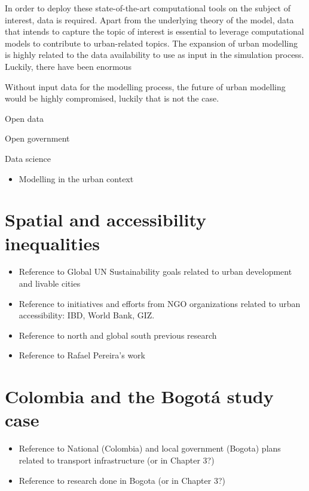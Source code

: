 \documentclass[12pt, a4paper]{report}
\begin{document}
In order to deploy these state-of-the-art computational tools on the subject of interest, data is required. Apart from the underlying theory of the model, data that intends to capture the topic of interest is essential to leverage computational models to contribute to urban-related topics. The expansion of urban modelling is highly related to the data availability to use as input in the simulation process. Luckily, there have been enormous 

Without input data for the modelling process, the future of urban modelling would be highly compromised, luckily that is not the case. 

Open data

Open government

Data science

\begin{itemize}
  \item Modelling in the urban context
\end{itemize}

\section{Spatial and accessibility inequalities}

\begin{itemize}
  \item Reference to Global UN Sustainability goals related to urban development and livable cities
  \item Reference to initiatives and efforts from NGO organizations related to urban accessibility: IBD, World Bank, GIZ.
  \item Reference to north and global south previous research
  \item Reference to Rafael Pereira's work
\end{itemize}

\section{Colombia and the Bogot\'{a} study case}

\begin{itemize}
  \item Reference to National (Colombia) and local government (Bogota) plans related to transport infrastructure (or in Chapter 3?)
  \item Reference to research done in Bogota (or in Chapter 3?)
\end{itemize}
\end{document}
